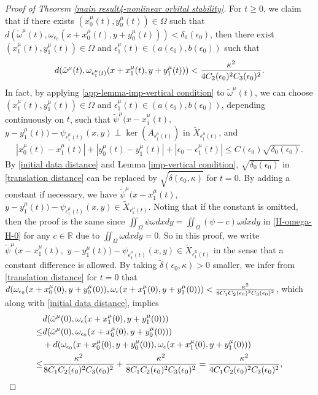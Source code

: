 \documentclass[1 [leqno, 11pt]{amsart}
\numberwithin{equation}{section}
\let\ep=\epsilon
\begin{document}
\begin{CJK*}{GBK}{song}
\begin{proof}[Proof of  Theorem \ref{main result4-nonlinear orbital stability}]
For $t\geq0$, we claim that if there exists $( x_0^\mu(t),y_0^\mu(t))\in\Omega$ such that $d(\tilde \omega^\mu(t),\omega_{\ep_0}(x+x_0^\mu(t),y+y_0^\mu(t)))<\delta_0(\ep_0)$, then there exist $(x_1^\mu(t),y_1^\mu(t))\in\Omega$ and $\ep_1^\mu(t)\in(a(\ep_0),b(\ep_0))$ such that
\begin{align}\label{a prior estimate}
d(\tilde \omega^\mu(t),\omega_{\ep_1^\mu(t)}(x+x_1^\mu(t),y+y_1^\mu(t)))<{\kappa^2\over4C_2(\ep_0)^2C_3(\ep_0)^2}.
\end{align}
In fact, by applying \eqref{app-lemma-imp-vertical condition} to  $\tilde \omega^\mu(t)$,  we can choose $(x_1^\mu(t),y_1^\mu(t))\in\Omega$ and $\ep_1^\mu(t)\in(a(\ep_0),b(\ep_0))$, depending continuously on $t$, such that
$\tilde \psi^\mu(x-x_1^\mu(t),$ $y-y_1^\mu(t))-\psi_{\ep_1^\mu(t)}(x,y)\perp\ker \left( A_{\ep_1^\mu(t)}\right)$
in $ \tilde X_{\ep_1^\mu(t)}$,
and
\begin{align}\label{translation distance}
|x_0^{\mu}(t)-x_1^{\mu}(t)|+|y_0^{\mu}(t)-y_1^{\mu}(t)|+|\ep_0-\ep_1^{\mu}(t)|\leq C(\ep_0)\sqrt{\delta_0(\ep_0)}.
\end{align}
By \eqref{initial data distance} and Lemma \ref{imp-vertical condition}, $\sqrt{\delta_0(\ep_0)}$ in \eqref{translation distance} can be replaced by $\sqrt{\tilde\delta(\ep_0,\kappa)}$ for $t=0$. By adding a constant if necessary, we have $\tilde \psi^\mu(x-x_1^\mu(t),$ $y-y_1^\mu(t))-\psi_{\ep_1^\mu(t)}(x,y)\in
\tilde X_{\ep_1^\mu(t)}$. Noting that if the constant is omitted, then the proof is the same since $\iint_\Omega\psi\omega dxdy=\iint_\Omega(\psi-c)\omega dxdy$ in  \eqref{H-omega-H-0} for any $c\in\mathbb{R}$ due to $\iint_\Omega\omega dxdy=0$. So in this proof, we write $\tilde \psi^\mu(x-x_1^\mu(t),$ $y-y_1^\mu(t))-\psi_{\ep_1^\mu(t)}(x,y)\in
\tilde X_{\ep_1^\mu(t)}$ in the sense that a constant difference is allowed.
By taking $\tilde\delta(\ep_0,\kappa)>0$ smaller, we infer from \eqref{translation distance} for $t=0$ that  $ d(\omega_{\ep_0}(x+x_0^\mu(0),y+y_0^\mu(0)),\omega_{\ep}(x+x_1^\mu(0),y+y_1^\mu(0)))<{\kappa^2\over8C_1C_2(\ep_0)^2C_3(\ep_0)^2}$, which along with \eqref{initial data distance}, implies
\begin{align*}
&d(\tilde \omega^\mu(0),\omega_{\ep}(x+x_1^\mu(0),y+y_1^\mu(0)))\\
\leq& d(\tilde \omega^\mu(0),\omega_{\ep_0}(x+x_0^\mu(0),y+y_0^\mu(0)))\\
&+d( \omega_{\ep_0}(x+x_0^\mu(0),y+y_0^\mu(0)), \omega_{\ep}(x+x_1^\mu(0), y+ y_1^\mu(0)))\\
\leq &{\kappa^2\over8C_1C_2(\ep_0)^2C_3(\ep_0)^2}+{\kappa^2\over8C_1C_2(\ep_0)^2C_3(\ep_0)^2}={\kappa^2\over4C_1C_2(\ep_0)^2C_3(\ep_0)^2},

\end{align*}
\end{proof}
\end{CJK*}
\end{document}
